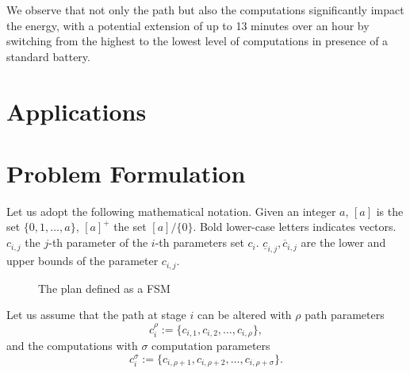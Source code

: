 We observe that not only the path but also the computations significantly impact the energy, with a potential extension of up to 13 minutes over an hour by switching from the highest to the lowest level of computations in presence of a standard battery.

\section{Applications}

\section{Problem Formulation}
\label{cp:intro:pb}

Let us adopt the following mathematical notation. Given an integer $a$, $[a]$ is the set $\{0,1,\dots,a\}$, $[a]^+$ the set $[a]/\{0\}$. Bold lower-case letters indicates vectors. $c_{i,j}$ the $j$-th parameter of the $i$-th parameters set $c_i$. $\underline{c}_{i,j},\overline{c}_{i,j}$ are the lower and upper bounds of the parameter $c_{i,j}$.

\begin{figure}[h]
  \center
  \caption{The plan defined as a FSM}
  \label{fig:state-machine}
\end{figure}

Let us assume that the path at stage $i$ can be altered with $\rho$ path parameters
\begin{equation}
    c_i^\rho:=\{c_{i,1},c_{i,2},\dots,c_{i,\rho}\},
\end{equation}
and the computations with $\sigma$ computation parameters 
\begin{equation}
    c_i^\sigma:=\{c_{i,\rho+1},c_{i,\rho+2},\dots,c_{i,\rho+\sigma}\}.
\end{equation}

